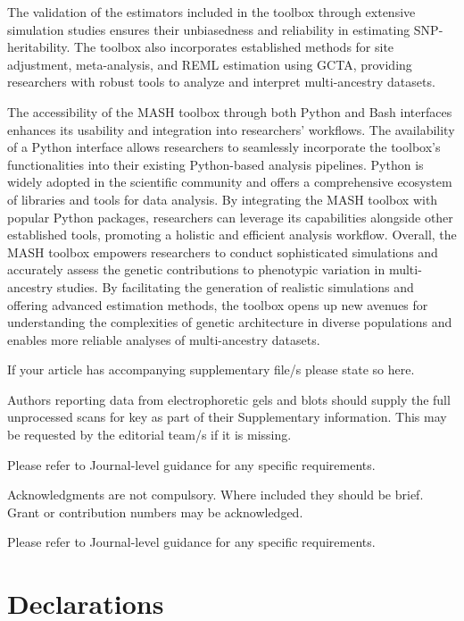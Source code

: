 \documentclass[sn-nature]{sn-jnl}%
\begin{document}
The validation of the estimators included in the toolbox through extensive simulation studies ensures their unbiasedness and reliability in estimating SNP-heritability. The toolbox also incorporates established methods for site adjustment, meta-analysis, and REML estimation using GCTA, providing researchers with robust tools to analyze and interpret multi-ancestry datasets.

The accessibility of the MASH toolbox through both Python and Bash interfaces enhances its usability and integration into researchers' workflows. The availability of a Python interface allows researchers to seamlessly incorporate the toolbox's functionalities into their existing Python-based analysis pipelines. Python is widely adopted in the scientific community and offers a comprehensive ecosystem of libraries and tools for data analysis. By integrating the MASH toolbox with popular Python packages, researchers can leverage its capabilities alongside other established tools, promoting a holistic and efficient analysis workflow.
Overall, the MASH toolbox empowers researchers to conduct sophisticated simulations and accurately assess the genetic contributions to phenotypic variation in multi-ancestry studies. By facilitating the generation of realistic simulations and offering advanced estimation methods, the toolbox opens up new avenues for understanding the complexities of genetic architecture in diverse populations and enables more reliable analyses of multi-ancestry datasets.

\backmatter


If your article has accompanying supplementary file/s please state so here. 

Authors reporting data from electrophoretic gels and blots should supply the full unprocessed scans for key as part of their Supplementary information. This may be requested by the editorial team/s if it is missing.

Please refer to Journal-level guidance for any specific requirements.


Acknowledgments are not compulsory. Where included they should be brief. Grant or contribution numbers may be acknowledged.

Please refer to Journal-level guidance for any specific requirements.

\section*{Declarations}
\end{document}
